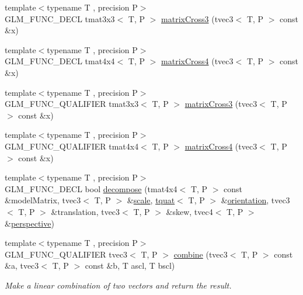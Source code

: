 \begin{DoxyCompactItemize}
\item 
{\footnotesize template$<$typename T , precision P$>$ }\\G\+L\+M\+\_\+\+F\+U\+N\+C\+\_\+\+D\+E\+C\+L tmat3x3$<$ T, P $>$ \hyperlink{group__gtx__matrix__cross__product_ga04385b2e3a93c78d116b51af2d8d708e}{matrix\+Cross3} (tvec3$<$ T, P $>$ const \&x)
\item 
{\footnotesize template$<$typename T , precision P$>$ }\\G\+L\+M\+\_\+\+F\+U\+N\+C\+\_\+\+D\+E\+C\+L tmat4x4$<$ T, P $>$ \hyperlink{group__gtx__matrix__cross__product_ga2d46cc5253761c214aa5c782865156b1}{matrix\+Cross4} (tvec3$<$ T, P $>$ const \&x)
\item 
{\footnotesize template$<$typename T , precision P$>$ }\\G\+L\+M\+\_\+\+F\+U\+N\+C\+\_\+\+Q\+U\+A\+L\+I\+F\+I\+E\+R tmat3x3$<$ T, P $>$ \hyperlink{group__gtx__matrix__cross__product_ga04385b2e3a93c78d116b51af2d8d708e}{matrix\+Cross3} (tvec3$<$ T, P $>$ const \&x)
\item 
{\footnotesize template$<$typename T , precision P$>$ }\\G\+L\+M\+\_\+\+F\+U\+N\+C\+\_\+\+Q\+U\+A\+L\+I\+F\+I\+E\+R tmat4x4$<$ T, P $>$ \hyperlink{group__gtx__matrix__cross__product_ga2d46cc5253761c214aa5c782865156b1}{matrix\+Cross4} (tvec3$<$ T, P $>$ const \&x)
\item 
{\footnotesize template$<$typename T , precision P$>$ }\\G\+L\+M\+\_\+\+F\+U\+N\+C\+\_\+\+D\+E\+C\+L bool \hyperlink{group__gtx__matrix__decompose_ga0f1245817507156b337798a253577c8b}{decompose} (tmat4x4$<$ T, P $>$ const \&model\+Matrix, tvec3$<$ T, P $>$ \&\hyperlink{group__gtc__matrix__transform_ga8f062fcc07e2445500793f2803afebb0}{scale}, \hyperlink{structglm_1_1tquat}{tquat}$<$ T, P $>$ \&\hyperlink{group__gtx__rotate__vector_ga49b4d082305cdfcfe0a5c184f684a902}{orientation}, tvec3$<$ T, P $>$ \&translation, tvec3$<$ T, P $>$ \&skew, tvec4$<$ T, P $>$ \&\hyperlink{group__gtc__matrix__transform_gac3613dcb6c6916465ad5b7ad5a786175}{perspective})
\item 
{\footnotesize template$<$typename T , precision P$>$ }\\G\+L\+M\+\_\+\+F\+U\+N\+C\+\_\+\+Q\+U\+A\+L\+I\+F\+I\+E\+R tvec3$<$ T, P $>$ \hyperlink{namespaceglm_affa804dafbed1af515631dadaddb4e4a}{combine} (tvec3$<$ T, P $>$ const \&a, tvec3$<$ T, P $>$ const \&b, T ascl, T bscl)
\begin{DoxyCompactList}\small\item\em Make a linear combination of two vectors and return the result. \end{DoxyCompactList}\item 

\end{DoxyCompactItemize}
